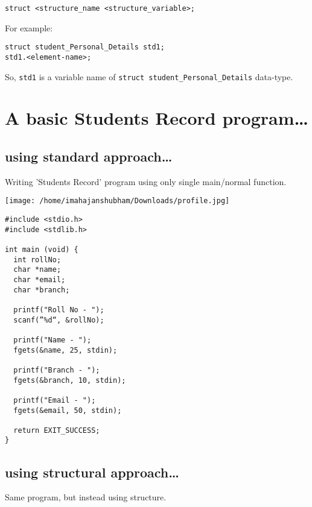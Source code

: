 \documentclass[11pt]{article}
\begin{document}
\begin{verbatim}
struct <structure_name <structure_variable>; 
\end{verbatim}

For example:

\begin{verbatim}
struct student_Personal_Details std1;
std1.<element-name>; 
\end{verbatim}

So, \texttt{std1} is a variable name of \texttt{struct student\_Personal\_Details} data-type.

\section{A basic Students Record program…}
\label{sec:org9c143b7}

\subsection{using standard approach…}
\label{sec:orgd7bc4dc}

Writing ’Students Record’ program using only single main/normal function.

\begin{center}
\texttt{[image: /home/imahajanshubham/Downloads/profile.jpg]}
\end{center}

\begin{verbatim}
#include <stdio.h>
#include <stdlib.h>

int main (void) {
  int rollNo;
  char *name;
  char *email;
  char *branch;

  printf("Roll No - ");
  scanf(”%d“, &rollNo);

  printf("Name - ");
  fgets(&name, 25, stdin);

  printf("Branch - ");
  fgets(&branch, 10, stdin);

  printf("Email - ");
  fgets(&email, 50, stdin);

  return EXIT_SUCCESS;
}
\end{verbatim}

\subsection{using structural approach…}
\label{sec:org95b39f8}

Same program, but instead using structure.
\end{document}
